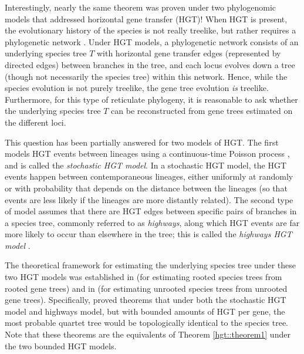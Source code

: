 Interestingly, nearly the same theorem was proven
under two phylogenomic models that addressed
horizontal gene transfer (HGT)!
When HGT is
present,  the evolutionary history of the species is 
not really treelike, but rather requires a 
phylogenetic network  \cite{MorrisonNetworks}. 
Under HGT models, 
a phylogenetic network  consists of
an underlying species tree $T$ with 
horizontal gene transfer
edges (represented by directed edges)  between 
branches in the tree, and
each locus evolves down a tree (though not
necessarily the species tree) within this network.
Hence, while the species evolution is not purely treelike, 
the gene tree evolution {\em is} treelike. 
Furthermore, for this type of reticulate phylogeny,
it is reasonable to ask whether the underlying species tree 
$T$
can be
reconstructed from gene trees estimated on the different
loci. 
 
This question has been partially answered for
two models of HGT.
The first models  HGT events between lineages 
using a continuous-time Poisson process \cite{Galtier07}, and
is called the
\emph{stochastic HGT model}. 
In a stochastic HGT model, the 
HGT events happen between contemporaneous lineages,
either uniformly at randomly or with probability that depends on the distance between the lineages
(so that events are less likely if the lineages are more distantly related).
The second type of model assumes that there are HGT edges 
between specific pairs of branches in a species tree, 
commonly referred to as \emph{highways}, 
along which HGT events are far more likely to occur than elsewhere in 
the tree;
this is called the
  \emph{highways HGT model} \cite{BeikoHighways}. 

The theoretical framework for estimating the underlying
species tree under these two HGT models was established in
\cite{SteelLGT1} (for estimating rooted species trees from
rooted gene trees) and in \cite{RochSnir} (for
estimating unrooted species trees from unrooted gene trees).
Specifically,
 \cite{RochSnir} proved theorems that
under both the stochastic HGT model and highways
model, but with
bounded amounts of HGT per gene,
the most probable quartet
tree would be topologically identical to the species tree.
Note that these
theorems are  the equivalents of Theorem \ref{hgt::theorem1}
under the two bounded HGT models. 

